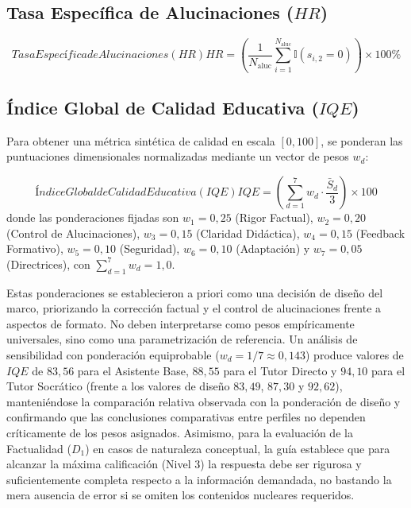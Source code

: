 \subsection{Tasa Específica de Alucinaciones (\texorpdfstring{$HR$}{HR})}
\begin{equation}[EQ:HR]{Tasa Específica de Alucinaciones (HR)}
    HR = \left( \frac{1}{N_{\text{aluc}}} \sum_{i=1}^{N_{\text{aluc}}} \mathbb{I}(s_{i,2} = 0) \right) \times 100\%
\end{equation}

\subsection{Índice Global de Calidad Educativa (\texorpdfstring{$IQE$}{IQE})}
Para obtener una métrica sintética de calidad en escala $[0, 100]$, se ponderan las puntuaciones dimensionales normalizadas mediante un vector de pesos $w_d$:

\begin{equation}[EQ:IQE]{Índice Global de Calidad Educativa (IQE)}
    IQE = \left( \sum_{d=1}^{7} w_d \cdot \frac{\bar{S}_d}{3} \right) \times 100
\end{equation}
donde las ponderaciones fijadas son $w_1 = 0{,}25$ (Rigor Factual), $w_2 = 0{,}20$ (Control de Alucinaciones), $w_3 = 0{,}15$ (Claridad Didáctica), $w_4 = 0{,}15$ (Feedback Formativo), $w_5 = 0{,}10$ (Seguridad), $w_6 = 0{,}10$ (Adaptación) y $w_7 = 0{,}05$ (Directrices), con $\sum_{d=1}^{7} w_d = 1{,}0$.

Estas ponderaciones se establecieron a priori como una decisión de diseño del marco, priorizando la corrección factual y el control de alucinaciones frente a aspectos de formato. No deben interpretarse como pesos empíricamente universales, sino como una parametrización de referencia. Un análisis de sensibilidad con ponderación equiprobable ($w_d = 1/7 \approx 0{,}143$) produce valores de $IQE$ de $83{,}56$ para el Asistente Base, $88{,}55$ para el Tutor Directo y $94{,}10$ para el Tutor Socrático (frente a los valores de diseño $83{,}49$, $87{,}30$ y $92{,}62$), manteniéndose la comparación relativa observada con la ponderación de diseño y confirmando que las conclusiones comparativas entre perfiles no dependen críticamente de los pesos asignados. Asimismo, para la evaluación de la Factualidad ($D_1$) en casos de naturaleza conceptual, la guía establece que para alcanzar la máxima calificación (Nivel 3) la respuesta debe ser rigurosa y suficientemente completa respecto a la información demandada, no bastando la mera ausencia de error si se omiten los contenidos nucleares requeridos.

